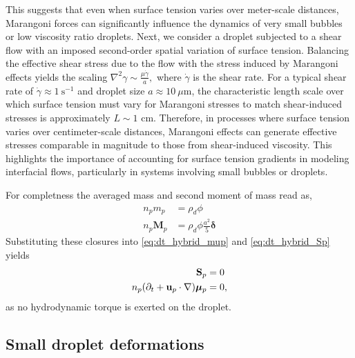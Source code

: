 This suggests that even when surface tension varies over meter-scale distances, Marangoni forces can significantly influence the dynamics of very small bubbles or low viscosity ratio droplets.
Next, we consider a droplet subjected to a shear flow with an imposed second-order spatial variation of surface tension. 
Balancing the effective shear stress due to the flow with the stress induced by Marangoni effects yields the scaling $\nabla^2 \gamma \sim \frac{\mu \dot{\gamma}}{a},$
where $\dot{\gamma}$ is the shear rate. 
For a typical shear rate of $\dot{\gamma} \approx 1\ \text{s}^{-1}$ and droplet size $a \approx 10\ \mu\text{m}$, the characteristic length scale over which surface tension must vary for Marangoni stresses to match shear-induced stresses is approximately $L \sim 1 \text{ cm}$.
Therefore, in processes where surface tension varies over centimeter-scale distances, Marangoni effects can generate effective stresses comparable in magnitude to those from shear-induced viscosity. 
This highlights the importance of accounting for surface tension gradients in modeling interfacial flows, particularly in systems involving small bubbles or droplets. 


For completness the averaged mass and second moment of mass read as, 
\begin{align}
    n_p m_p &= \rho_d \phi   
    \label{eq:volume}
    \\ 
    \label{eq:second_moment_of_mass0}
    n_p \textbf{M}_p &= \rho_d\phi \frac{a^2}{5}\bm\delta
\end{align}
Substituting these closures into  \ref{eq:dt_hybrid_mup} and \ref{eq:dt_hybrid_Sp} yields
\begin{align}
    \textbf{S}_p &= 0 \label{eq:S_eq_zerp}\\
    n_p (\pddt + \textbf{u}_p \cdot \grad)\bm\mu_p &= 0,
\end{align}
as no hydrodynamic torque is exerted on the droplet.
\subsection{Small droplet deformations}

